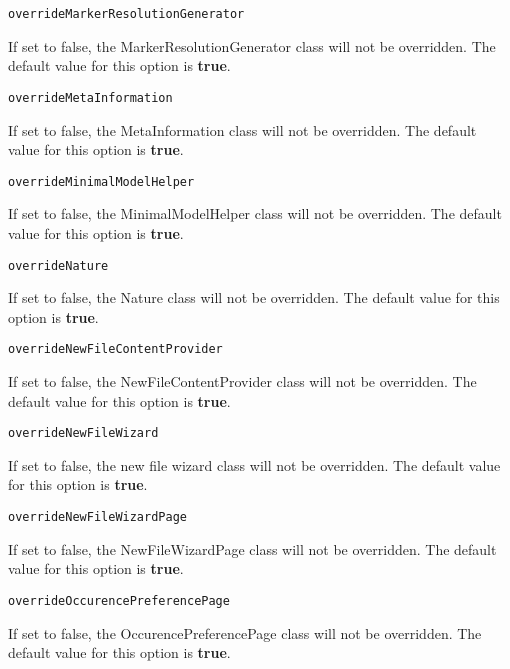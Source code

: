 \noindent\texttt{overrideMarkerResolutionGenerator}
\begin{myindentpar}{1cm}
If set to false, the MarkerResolutionGenerator class will not be overridden. The default value for this option is \textbf{true}.
\end{myindentpar}

\noindent\texttt{overrideMetaInformation}
\begin{myindentpar}{1cm}
If set to false, the MetaInformation class will not be overridden. The default value for this option is \textbf{true}.
\end{myindentpar}

\noindent\texttt{overrideMinimalModelHelper}
\begin{myindentpar}{1cm}
If set to false, the MinimalModelHelper class will not be overridden. The default value for this option is \textbf{true}.
\end{myindentpar}

\noindent\texttt{overrideNature}
\begin{myindentpar}{1cm}
If set to false, the Nature class will not be overridden. The default value for this option is \textbf{true}.
\end{myindentpar}

\noindent\texttt{overrideNewFileContentProvider}
\begin{myindentpar}{1cm}
If set to false, the NewFileContentProvider class will not be overridden. The default value for this option is \textbf{true}.
\end{myindentpar}

\noindent\texttt{overrideNewFileWizard}
\begin{myindentpar}{1cm}
If set to false, the new file wizard class will not be overridden. The default value for this option is \textbf{true}.
\end{myindentpar}

\noindent\texttt{overrideNewFileWizardPage}
\begin{myindentpar}{1cm}
If set to false, the NewFileWizardPage class will not be overridden. The default value for this option is \textbf{true}.
\end{myindentpar}

\noindent\texttt{overrideOccurencePreferencePage}
\begin{myindentpar}{1cm}
If set to false, the OccurencePreferencePage class will not be overridden. The default value for this option is \textbf{true}.
\end{myindentpar}

